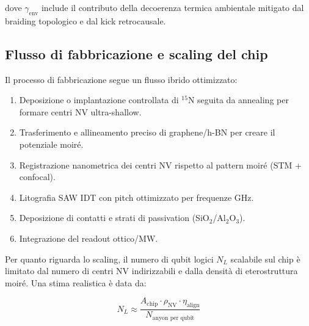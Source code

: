 \documentclass[11pt,a4paper]{article}
\theoremstyle{plain}
\theoremstyle{definition}
\begin{document}
\vspace{0.3cm}

dove $\gamma_{\text{env}}$ include il contributo della decoerenza termica ambientale mitigato dal braiding topologico e dal kick retrocausale.



\vspace{0.5cm}

\subsection{Flusso di fabbricazione e scaling del chip}

\vspace{0.2cm}

Il processo di fabbricazione segue un flusso ibrido ottimizzato:

\vspace{0.2cm}

\begin{enumerate}
    \item Deposizione o implantazione controllata di ${}^{15}$N seguita da annealing per formare centri NV ultra-shallow.
    \item Trasferimento e allineamento preciso di graphene/h-BN per creare il potenziale moiré.
    \item Registrazione nanometrica dei centri NV rispetto al pattern moiré (STM + confocal).
    \item Litografia SAW IDT con pitch ottimizzato per frequenze GHz.
    \item Deposizione di contatti e strati di passivation (SiO$_2$/Al$_2$O$_3$).
    \item Integrazione del readout ottico/MW.
\end{enumerate}


\vspace{0.3cm}

Per quanto riguarda lo scaling, il numero di qubit logici $N_L$ scalabile sul chip è limitato dal numero di centri NV indirizzabili e dalla densità di eterostruttura moiré. Una stima realistica è data da:


\vspace{0.3cm}

\begin{tcolorbox}[colback=blue!5!white, colframe=blue!75!black, title={Scaling del chip}]
\begin{equation}
N_L \approx \frac{A_{\text{chip}} \cdot \rho_{\text{NV}} \cdot \eta_{\text{align}}}{N_{\text{anyon per qubit}}}
\label{eq:scaling}
\end{equation}
\end{tcolorbox}
\end{document}
